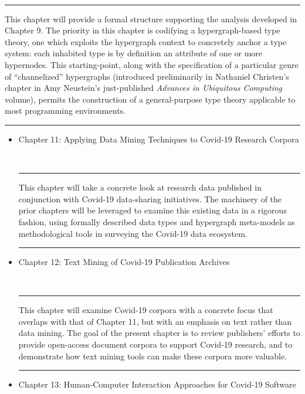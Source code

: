 \documentclass{statsoc}
\newcommand{\q}[1]{{\fontfamily{qcr}\selectfont ``}#1{\fontfamily{qcr}\selectfont ''}}
\newenvironment{summary}{\\\vspace{-4pt}%
%
%
\noindent\hfil\textcolor{rgrey!50!purple}{\rule{0.5\textwidth}{.4pt}}\hfil

\hspace{-2cm}\begin{minipage}{1.02\textwidth}\fontfamily{phv}\fontsize{9}{11}\selectfont}%
{\\\vspace{-1em}\end{minipage}
{\begin{center}\textcolor{rgrey!50!yellow}{\rule{0.5\textwidth}{.4pt}}\end{center}}
\vspace{2em}}%
\begin{document}
{\begin{description}
\begin{itemize}
\begin{summary}
This chapter will provide a formal structure supporting 
the analysis developed in Chapter 9.  The priority 
in this chapter is codifying a hypergraph-based 
type theory, one which exploits the hypergraph context 
to concretely anchor a type system: each inhabited 
type is by definition an attribute of one or more 
hypernodes.  This starting-point, along with the 
specification of a particular genre of 
\q{channelized} hypergraphs (introduced preliminarily in 
Nathaniel Christen's chapter in Amy Neustein's 
just-published \textit{Advances in Ubiquitous Computing} 
volume), permits the construction of a general-purpose 
type theory applicable to most programming environments.  
\end{summary}

\end{itemize}

\item[Part III: Text and Data Mining for Covid-19]

\begin{itemize}

\item Chapter 11: Applying Data Mining Techniques to Covid-19 Research Corpora

\begin{summary}
This chapter will take a concrete look at research data published 
in conjunction with Covid-19 data-sharing initiatives.  
The machinery of the prior chapters will be leveraged 
to examine this existing data in a rigorous fashion, 
using formally described data types and hypergraph 
meta-models as methodological tools in surveying the 
Covid-19 data ecosystem.
\end{summary}

\item Chapter 12: Text Mining of Covid-19 Publication Archives

\begin{summary}
This chapter will examine Covid-19 corpora with a concrete 
focus that overlaps with that of Chapter 11, but with an emphasis 
on text rather than data mining.  The goal of the 
present chapter is to review publishers' efforts to 
provide open-access document corpora to support 
Covid-19 research, and to demonstrate how text 
mining tools can make these corpora more valuable.
\end{summary}

\item Chapter 13: Human-Computer Interaction Approaches for Covid-19 Software 


\end{itemize}
\end{description}}
\end{document}
